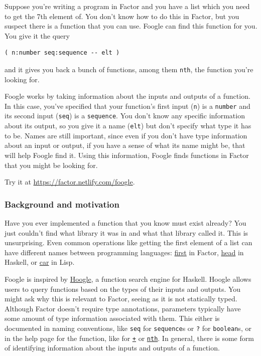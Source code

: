 \documentclass[
]{article}
\begin{document}
Suppose you're writing a program in Factor and you have a list which you
need to get the 7th element of. You don't know how to do this in Factor,
but you suspect there is a function that you can use. Foogle can find
this function for you. You give it the query

\begin{verbatim}
( n:number seq:sequence -- elt )
\end{verbatim}

and it gives you back a bunch of functions, among them \texttt{nth}, the
function you're looking for.

Foogle works by taking information about the inputs and outputs of a
function. In this case, you've specified that your function's first
input (\texttt{n}) is a \texttt{number} and its second input
(\texttt{seq}) is a \texttt{sequence}. You don't know any specific
information about its output, so you give it a name (\texttt{elt}) but
don't specify what type it has to be. Names are still important, since
even if you don't have type information about an input or output, if you
have a sense of what its name might be, that will help Foogle find it.
Using this information, Foogle finds functions in Factor that you might
be looking for.

Try it at \url{https://factor.netlify.com/foogle}.

\hypertarget{background-and-motivation}{%
\subsubsection{Background and
motivation}\label{background-and-motivation}}

Have you ever implemented a function that you know must exist already?
You just couldn't find what library it was in and what that library
called it. This is unsurprising. Even common operations like getting the
first element of a list can have different names between programming
languages:
\href{https://docs.factorcode.org/content/word-first,sequences.html}{first}
in Factor,
\href{https://hackage.haskell.org/package/base-4.12.0.0/docs/Data-List.html\#v:head}{head}
in Haskell, or
\href{https://www.gnu.org/software/emacs/manual/html_node/eintr/car-_0026-cdr.html}{car}
in Lisp.

Foogle is inspired by \href{https://hoogle.haskell.org/}{Hoogle}, a
function search engine for Haskell. Hoogle allows users to query
functions based on the types of their inputs and outputs. You might ask
why this is relevant to Factor, seeing as it is not statically typed.
Although Factor doesn't require type annotations, parameters typically
have some amount of type information associated with them. This either
is documented in naming conventions, like \texttt{seq} for
\texttt{sequence}s or \texttt{?} for \texttt{boolean}s, or in the help
page for the function, like for
\href{https://docs.factorcode.org/content/word-+,math.html}{\texttt{+}}
or
\href{https://docs.factorcode.org/content/word-nth\%2Csequences.html}{\texttt{nth}}.
In general, there is some form of identifying information about the
inputs and outputs of a function.
\end{document}
